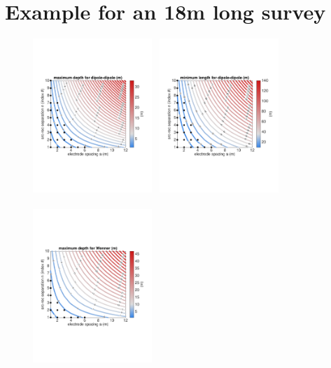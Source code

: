 \documentclass[a4paper,12pt]{article}
\begin{document}
\section{Example for an 18m long survey}
%
%
\begin{figure}[!h]
\centering
\includegraphics[trim={20 170 30 180},clip,width=0.4\textwidth]{../pics/depth-dipole-18m.pdf}~
\includegraphics[trim={20 170 30 180},clip,width=0.4\textwidth]{../pics/min-length-dipole-18m.pdf}\\~\\
\includegraphics[trim={20 170 30 180},clip,width=0.4\textwidth]{../pics/depth-wenner-18m.pdf}~

\end{figure}
\end{document}
